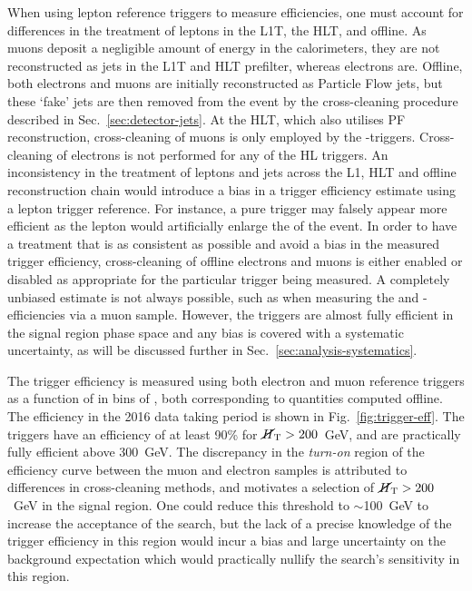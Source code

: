 When using lepton reference triggers to measure efficiencies, one must account 
for differences in the treatment of leptons in the L1T, the HLT, and offline. 
As muons deposit a negligible amount of energy in the calorimeters, they are 
not reconstructed as jets in the L1T and HLT prefilter, whereas electrons are. 
Offline, both electrons and muons are initially reconstructed as Particle Flow 
jets, but these `fake' jets are then removed from the event 
by the cross-cleaning procedure described in Sec.~\ref{sec:detector-jets}.
At the HLT, which also utilises PF reconstruction, 
cross-cleaning of muons is only employed by the \met-\mht triggers.
Cross-cleaning of electrons is not performed for any of the HL triggers.
An inconsistency in the treatment of leptons and jets across the L1, HLT and 
offline reconstruction chain would introduce a bias in a trigger efficiency 
estimate using a lepton trigger reference. For instance, a pure \scalht trigger 
may falsely appear more efficient as the lepton would artificially enlarge the 
\scalht of the event.
In order to have a treatment that is as consistent as possible and avoid a bias 
in the measured trigger efficiency, cross-cleaning of offline electrons and 
muons is either enabled or disabled as appropriate for the particular trigger 
being measured.
A completely unbiased estimate is not always possible, such as when measuring 
the \scalht and \scalht-\alphat efficiencies via a muon sample. However, the 
triggers are almost fully efficient in the signal region phase space and any 
bias is covered with a systematic uncertainty, as will be 
discussed further in Sec.~\ref{sec:analysis-systematics}.

The trigger efficiency is measured using both electron and muon reference 
triggers as a function of \mht in bins of \scalht, 
both corresponding to quantities computed offline. The efficiency in the 2016 
data taking period is shown in Fig.~\ref{fig:trigger-eff}. The triggers have an 
efficiency of at least 90\% for $\mbox{$\cancel{H}_\text{T}$}>200$~GeV, and are practically fully 
efficient 
above 300~GeV. The discrepancy in the \textit{turn-on} region of the efficiency 
curve between the muon and electron samples is attributed to differences in 
cross-cleaning methods, and motivates a selection of $\mbox{$\cancel{H}_\text{T}$}>200$~GeV in the 
signal region. One could reduce this threshold to $\sim$100~GeV to increase the 
acceptance of the search, but the lack of a precise knowledge of the trigger 
efficiency in this region would incur a bias and large uncertainty on the 
background expectation which would practically nullify the search's sensitivity 
in this region.

